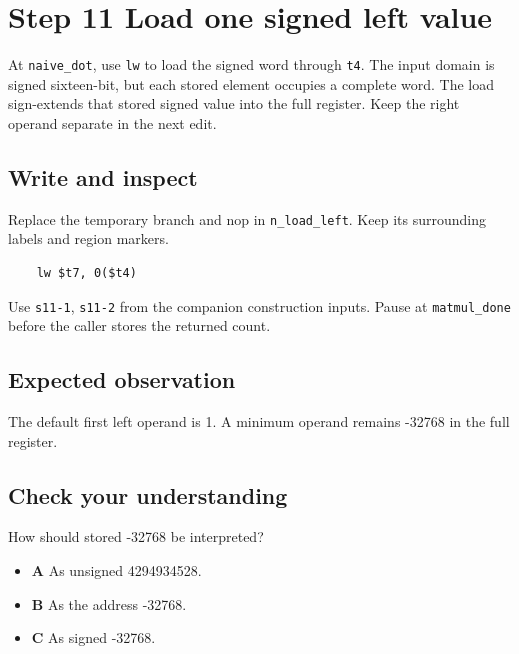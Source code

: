 \section{Step 11 Load one signed left value}\label{matmul-s11}

At \texttt{naive\_dot}, use \texttt{lw} to load the signed word through \texttt{t4}. The input domain is signed sixteen-bit, but each stored element occupies a complete word. The load sign-extends that stored signed value into the full register. Keep the right operand separate in the next edit.

\subsection{Write and inspect}
Replace the temporary branch and nop in \texttt{n\_load\_left}. Keep its surrounding labels and region markers.

\begin{verbatim}
    lw $t7, 0($t4)
\end{verbatim}
Use \texttt{s11-1}, \texttt{s11-2} from the companion construction inputs. Pause at \texttt{matmul\_done} before the caller stores the returned count.

\subsection{Expected observation}
The default first left operand is 1. A minimum operand remains -32768 in the full register.

\subsection{Check your understanding}
How should stored -32768 be interpreted?

\begin{itemize}
  \item \textbf{A} As unsigned 4294934528.
  \item \textbf{B} As the address -32768.
  \item \textbf{C} As signed -32768.
\end{itemize}
